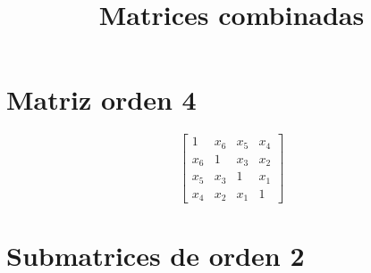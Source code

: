 \documentclass[12pt]{article}
\begin{document}
\title{Matrices combinadas}
\maketitle

\section*{Matriz orden 4}

$$\left[\begin{matrix}1 & x_{6} & x_{5} & x_{4}\\x_{6} & 1 & x_{3} & x_{2}\\x_{5} & x_{3} & 1 & x_{1}\\x_{4} & x_{2} & x_{1} & 1\end{matrix}\right]$$

\section*{Submatrices de orden 2}
\end{document}
